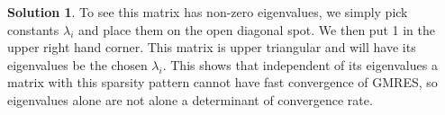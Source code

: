 \documentclass[12pt]{article}
\theoremstyle{definition}
\newtheorem{sol}{Solution}
\theoremstyle{remark}
\begin{document}
\begin{sol}
To see this matrix has non-zero eigenvalues, we simply pick constants $\lambda_{i}$ and place them on the open diagonal spot. We then put 1 in the upper right hand corner. This matrix is upper triangular  and will have its eigenvalues be the chosen $\lambda_{i}$. This shows that independent of its eigenvalues a matrix with this sparsity pattern cannot have fast convergence of GMRES, so eigenvalues alone are not alone a determinant of convergence rate.
\end{sol}
\end{document}
